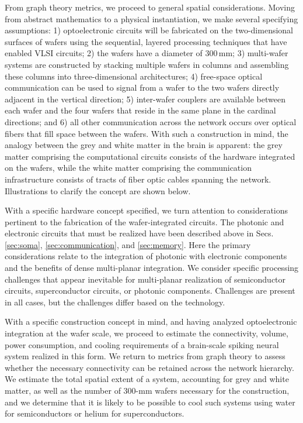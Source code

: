 \documentclass[twocolumn]{article}
\begin{document}
From graph theory metrics, we proceed to general spatial considerations. Moving from abstract mathematics to a physical instantiation, we make several specifying assumptions: 1) optoelectronic circuits will be fabricated on the two-dimensional surfaces of wafers using the sequential, layered processing techniques that have enabled VLSI circuits; 2) the wafers have a diameter of 300\,mm; 3) multi-wafer systems are constructed by stacking multiple wafers in columns and assembling these columns into three-dimensional architectures; 4) free-space optical communication can be used to signal from a wafer to the two wafers directly adjacent in the vertical direction; 5) inter-wafer couplers are available between each wafer and the four wafers that reside in the same plane in the cardinal directions; and 6) all other communication across the network occurs over optical fibers that fill space between the wafers. With such a construction in mind, the analogy between the grey and white matter in the brain is apparent: the grey matter comprising the computational circuits consists of the hardware integrated on the wafers, while the white matter comprising the communication infrastructure consists of tracts of fiber optic cables spanning the network. Illustrations to clarify the concept are shown below.

With a specific hardware concept specified, we turn attention to considerations pertinent to the fabrication of the wafer-integrated circuits. The photonic and electronic circuits that must be realized have been described above in Secs. \ref{sec:soma}, \ref{sec:communication}, and \ref{sec:memory}. Here the primary considerations relate to the integration of photonic with electronic components and the benefits of dense multi-planar integration. We consider specific processing challenges that appear inevitable for multi-planar realization of semiconductor circuits, superconductor circuits, or photonic components. Challenges are present in all cases, but the challenges differ based on the technology.

With a specific construction concept in mind, and having analyzed optoelectronic integration at the wafer scale, we proceed to estimate the connectivity, volume, power consumption, and cooling requirements of a brain-scale spiking neural system realized in this form. We return to metrics from graph theory to assess whether the necessary connectivity can be retained across the network hierarchy. We estimate the total spatial extent of a system, accounting for grey and white matter, as well as the number of 300-mm wafers necessary for the construction, and we determine that it is likely to be possible to cool such systems using water for semiconductors or helium for superconductors.
\end{document}

